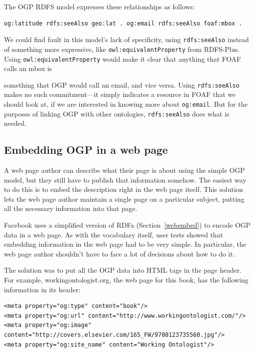 The OGP RDFS model expresses these relationships as follows:

\begin{lstlisting}
og:latitude rdfs:seeAlso geo:lat . og:email rdfs:seeAlso foaf:mbox .
\end{lstlisting}

We could find fault in this model's lack of specificity, using
\texttt{rdfs:seeAlso} instead of something more expressive, like
\texttt{owl:equivalentProperty} from RDFS-Plus. Using \texttt{owl:equivalentProperty}
would make it clear that anything that FOAF calls an mbox is

something that OGP would call an email, and vice versa. Using
\texttt{rdfs:seeAlso} makes no such commitment---it simply indicates a resource
in FOAF that we should look at, if we are interested in knowing more
about \texttt{og:email}. But for the purposes of linking OGP with other
ontologies, \texttt{rdfs:seeAlso} does what is needed.

\subsection{Embedding OGP in a web page}

A web page author can describe what their page is about using the simple
OGP model, but they still have to publish that information somehow. The
easiest way to do this is to embed the description right in the web page
itself. This solution lets the web page author maintain a single page on
a particular subject, putting all the necessary information into that
page.

Facebook uses a simplified version of RDFa (Section~\ref{webembed}) to 
encode OGP data in a web
page. As with the vocabulary itself, user tests showed that embedding
information in the web page had to be very simple. In particular, the
web page author shouldn't have to face a lot of decisions about how to
do it.

The solution was to put all the OGP data into HTML tags in the page
header. For example, workingontologist.org, the web page for this book,
has the following information in its header:

\begin{lstlisting}
<meta property="og:type" content="book"/>
<meta property="og:url" content="http://www.workingontologist.com/"/>
<meta property="og:image" content="http://covers.elsevier.com/165_FW/9780123735560.jpg"/>
<meta property="og:site_name" content="Working Ontologist"/>
\end{lstlisting}


